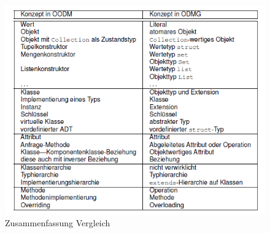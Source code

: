 \begin{figure}[!h]
	\centering
	\includegraphics[scale=0.6]{img/odmg_summary.png}
	\caption{Zusammenfassung Vergleich}
\end{figure}
\newpage
